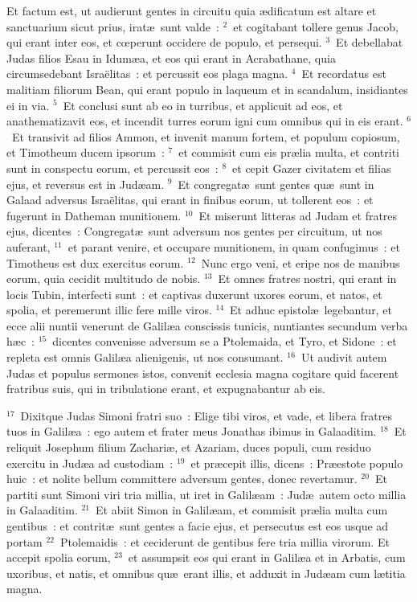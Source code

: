 \lettrine[lines=3,image=true,loversize=0.05,lraise=-0.03]{E}{}t factum est, ut audierunt gentes in circuitu quia \ae dificatum est altare et sanctuarium sicut prius, irat\ae\ sunt valde~:
${}^{2}$~et cogitabant tollere genus Jacob, qui erant inter eos, et cœperunt occidere de populo, et persequi.
${}^{3}$~Et debellabat Judas filios Esau in Idum\ae a, et eos qui erant in Acrabathane, quia circumsedebant Isra\"elitas~: et percussit eos plaga magna.
${}^{4}$~Et recordatus est malitiam filiorum Bean, qui erant populo in laqueum et in scandalum, insidiantes ei in via.
${}^{5}$~Et conclusi sunt ab eo in turribus, et applicuit ad eos, et anathematizavit eos, et incendit turres eorum igni cum omnibus qui in eis erant.
${}^{6}$~Et transivit ad filios Ammon, et invenit manum fortem, et populum copiosum, et Timotheum ducem ipsorum~:
${}^{7}$~et commisit cum eis pr\ae lia multa, et contriti sunt in conspectu eorum, et percussit eos~:
${}^{8}$~et cepit Gazer civitatem et filias ejus, et reversus est in Jud\ae am.
${}^{9}$~Et congregat\ae\ sunt gentes qu\ae\ sunt in Galaad adversus Isra\"elitas, qui erant in finibus eorum, ut tollerent eos~: et fugerunt in Datheman munitionem.
${}^{10}$~Et miserunt litteras ad Judam et fratres ejus, dicentes~: Congregat\ae\ sunt adversum nos gentes per circuitum, ut nos auferant,
${}^{11}$~et parant venire, et occupare munitionem, in quam confugimus~: et Timotheus est dux exercitus eorum.
${}^{12}$~Nunc ergo veni, et eripe nos de manibus eorum, quia cecidit multitudo de nobis.
${}^{13}$~Et omnes fratres nostri, qui erant in locis Tubin, interfecti sunt~: et captivas duxerunt uxores eorum, et natos, et spolia, et peremerunt illic fere mille viros.
${}^{14}$~Et adhuc epistol\ae\ legebantur, et ecce alii nuntii venerunt de Galil\ae a conscissis tunicis, nuntiantes secundum verba h\ae c~:
${}^{15}$~dicentes convenisse adversum se a Ptolemaida, et Tyro, et Sidone~: et repleta est omnis Galil\ae a alienigenis, ut nos consumant.
${}^{16}$~Ut audivit autem Judas et populus sermones istos, convenit ecclesia magna cogitare quid facerent fratribus suis, qui in tribulatione erant, et expugnabantur ab eis.


${}^{17}$~Dixitque Judas Simoni fratri suo~: Elige tibi viros, et vade, et libera fratres tuos in Galil\ae a~: ego autem et frater meus Jonathas ibimus in Galaaditim.
${}^{18}$~Et reliquit Josephum filium Zachari\ae , et Azariam, duces populi, cum residuo exercitu in Jud\ae a ad custodiam~:
${}^{19}$~et pr\ae cepit illis, dicens~: Pr\ae estote populo huic~: et nolite bellum committere adversum gentes, donec revertamur.
${}^{20}$~Et partiti sunt Simoni viri tria millia, ut iret in Galil\ae am~: Jud\ae\ autem octo millia in Galaaditim.
${}^{21}$~Et abiit Simon in Galil\ae am, et commisit pr\ae lia multa cum gentibus~: et contrit\ae\ sunt gentes a facie ejus, et persecutus est eos usque ad portam
${}^{22}$~Ptolemaidis~: et ceciderunt de gentibus fere tria millia virorum. Et accepit spolia eorum,
${}^{23}$~et assumpsit eos qui erant in Galil\ae a et in Arbatis, cum uxoribus, et natis, et omnibus qu\ae\ erant illis, et adduxit in Jud\ae am cum l\ae titia magna.



